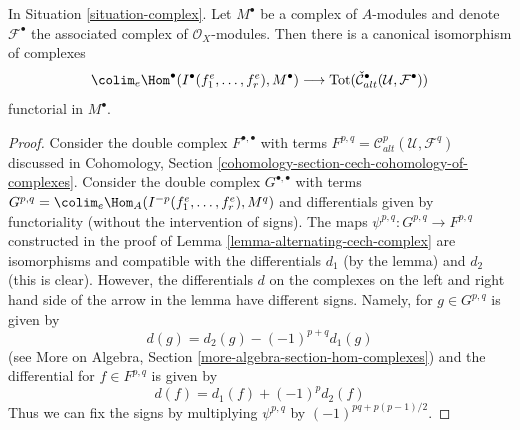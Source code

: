 \begin{lemma}
\label{lemma-alternating-cech-complex-complex}
In Situation \ref{situation-complex}. Let $M^\bullet$ be a
complex of $A$-modules and
denote $\mathcal{F}^\bullet$ the associated complex of
$\mathcal{O}_X$-modules. Then
there is a canonical isomorphism of complexes
$$
\colim_e \Hom^\bullet(I^\bullet(f_1^e, \ldots, f_r^e), M^\bullet)
\longrightarrow
\text{Tot}(\check{\mathcal{C}}_{alt}^\bullet(\mathcal{U}, \mathcal{F}^\bullet))
$$
functorial in $M^\bullet$.
\end{lemma}

\begin{proof}
Consider the double complex $F^{\bullet, \bullet}$ with terms
$F^{p, q} = \mathcal{C}_{alt}^p(\mathcal{U}, \mathcal{F}^q)$
discussed in
Cohomology, Section \ref{cohomology-section-cech-cohomology-of-complexes}.
Consider the double complex $G^{\bullet, \bullet}$ with terms
$G^{p, q} = \colim_e \Hom_A(I^{-p}(f_1^e, \ldots, f_r^e), M^q)$ and
differentials given by functoriality (without the intervention
of signs). The maps $\psi^{p, q} : G^{p, q} \to F^{p, q}$
constructed in the proof of Lemma \ref{lemma-alternating-cech-complex}
are isomorphisms and compatible with the differentials $d_1$ (by the lemma)
and $d_2$ (this is clear). However, the differentials $d$ on the
complexes on the left and right hand side of the arrow in the lemma
have different signs. Namely, for $g \in G^{p, q}$ is given by
$$
d(g) =  d_2(g) - (-1)^{p + q} d_1(g) 
$$
(see More on Algebra, Section \ref{more-algebra-section-hom-complexes})
and the differential for $f \in F^{p, q}$ is given by
$$
d(f) = d_1(f) + (-1)^p d_2(f)
$$
Thus we can fix the signs by multiplying $\psi^{p, q}$ by
$(-1)^{pq + p(p - 1)/2}$.
\end{proof}
